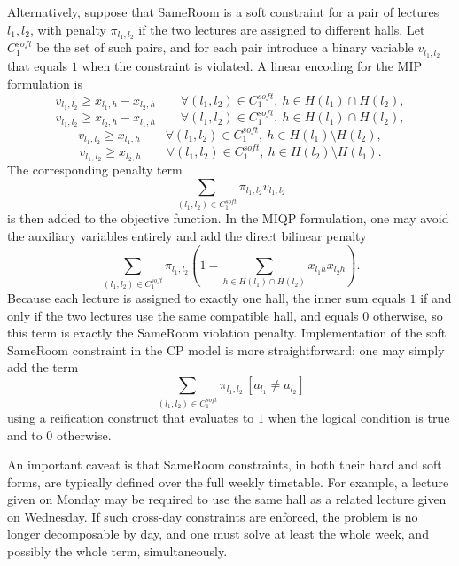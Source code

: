 \documentclass[11pt]{article}
\begin{document}
Alternatively, suppose that SameRoom is a soft constraint for a pair of lectures $l_1,l_2$, with penalty $\pi_{l_1,l_2}$ if the two lectures are assigned to different halls. Let $C_1^{soft}$ be the set of such pairs, and for each pair introduce a binary variable $v_{l_1,l_2}$ that equals $1$ when the constraint is violated. A linear encoding for the MIP formulation is
\begin{equation}
	\label{eq:soft-SameRoom-a} v_{l_1,l_2} \ge x_{l_1,h} - x_{l_2,h} \qquad \forall (l_1,l_2) \in C_1^{soft},\ h \in H(l_1) \cap H(l_2),
\end{equation}
\begin{equation}
	\label{eq:soft-SameRoom-b} v_{l_1,l_2} \ge x_{l_2,h} - x_{l_1,h} \qquad \forall (l_1,l_2) \in C_1^{soft},\ h \in H(l_1) \cap H(l_2),
\end{equation}
\begin{equation}
	\label{eq:soft-SameRoom-c} v_{l_1,l_2} \ge x_{l_1,h} \qquad \forall (l_1,l_2) \in C_1^{soft},\ h \in H(l_1)\setminus H(l_2),
\end{equation}
\begin{equation}
	\label{eq:soft-SameRoom-d} v_{l_1,l_2} \ge x_{l_2,h} \qquad \forall (l_1,l_2) \in C_1^{soft},\ h \in H(l_2)\setminus H(l_1).
\end{equation}
The corresponding penalty term
\[
\sum_{(l_1,l_2) \in C_1^{soft}} \pi_{l_1,l_2} v_{l_1,l_2}
\]
is then added to the objective function. In the MIQP formulation, one may avoid the auxiliary variables entirely and add the direct bilinear penalty
\[
\sum_{(l_1,l_2) \in C_1^{soft}} \pi_{l_1,l_2}
\left(
1-\sum_{h \in H(l_1)\cap H(l_2)} x_{l_1h}x_{l_2h}
\right).
\]
Because each lecture is assigned to exactly one hall, the inner sum equals $1$ if and only if the two lectures use the same compatible hall, and equals $0$ otherwise, so this term is exactly the SameRoom violation penalty. Implementation of the soft SameRoom constraint in the CP model is more straightforward: one may simply add the term
\[
\sum_{(l_1,l_2) \in C_1^{soft}} \pi_{l_1,l_2}\,[a_{l_1} \ne a_{l_2}]
\]
using a reification construct that evaluates to $1$ when the logical condition is true and to $0$ otherwise.

An important caveat is that SameRoom constraints, in both their hard and soft forms, are typically defined over the full weekly timetable. For example, a lecture given on Monday may be required to use the same hall as a related lecture given on Wednesday. If such cross-day constraints are enforced, the problem is no longer decomposable by day, and one must solve at least the whole week, and possibly the whole term, simultaneously.
\end{document}
